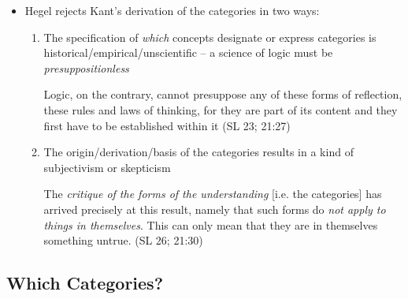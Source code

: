 \documentclass[12pt]{article}
\begin{document}
\begin{itemize}
\item Hegel rejects Kant's derivation of the categories in two ways:
\begin{enumerate}
\item The specification of \emph{which} concepts designate or express categories is
historical/empirical/unscientific -- a science of logic must be \emph{presuppositionless}

\begin{quote-b}
Logic, on the contrary, cannot presuppose any of these forms of
reflection, these rules and laws of thinking, for they are part of its
content and they first have to be established within it (SL 23; 21:27)
\end{quote-b}

\item The origin/derivation/basis of the categories results in a kind of
subjectivism or skepticism

\begin{quote-b}
The \emph{critique of the forms of the understanding} [i.e. the categories] has
arrived precisely at this result, namely that such forms do \emph{not apply to
things in themselves}. This can only mean that they are in themselves
something untrue. (SL 26; 21:30)
\end{quote-b}
\end{enumerate}
\end{itemize}

\subsection{Which Categories?}
\label{sec:org2925d84}
\end{document}
